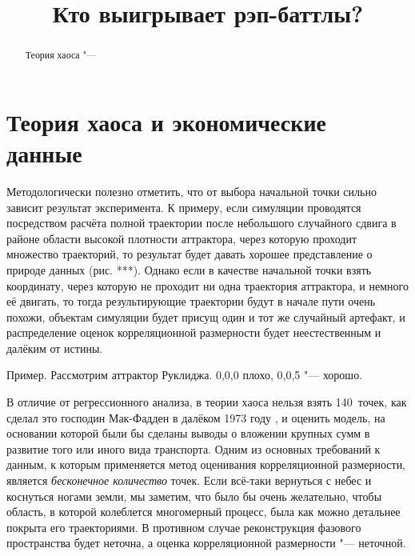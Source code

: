 \documentclass[final,pdftex]{../../template/epsilonj}
\begin{document}
	
	\begin{frontmatter}
		\title{Кто выигрывает рэп-баттлы?}
		
		\begin{aug}
			\author{ }%
			
			
			\address{НИУ ВШЭ, Москва.}
		\end{aug}
		
		\begin{abstract}
			Теория хаоса "--- 
		\end{abstract}
		
		\begin{keyword}
		\end{keyword}
		
	\end{frontmatter}
	
	
	\section{Теория хаоса и экономические данные}

Методологически полезно отметить, что от выбора начальной точки сильно зависит результат эксперимента. К примеру, если симуляции проводятся посредством расчёта полной траектории после небольшого случайного сдвига в районе области высокой плотности аттрактора, через которую проходит множество траекторий, то результат будет давать хорошее представление о природе данных (рис. ***). Однако если в качестве начальной точки взять координату, через которую не проходит ни одна траектория аттрактора, и немного её двигать, то тогда результирующие траектории будут в начале пути очень похожи, объектам симуляции будет присущ один и тот же случайный артефакт, и распределение оценок корреляционной размерности будет неестественным и далёким от истины.

Пример. Рассмотрим аттрактор Руклиджа. 0,0,0  плохо, 0,0,5 "--- хорошо.

В отличие от регрессионного анализа, в теории хаоса нельзя взять 140~точек, как сделал это господин Мак-Фадден в далёком 1973 году \citep{mcfadden73clogit}, и оценить модель, на основании которой были бы сделаны выводы о вложении крупных сумм в развитие того или иного вида транспорта. Одним из основных требований к данным, к которым применяется метод оценивания корреляционной размерности, является \textit{бесконечное количество} точек. Если всё-таки вернуться с небес и коснуться ногами земли, мы заметим, что было бы очень желательно, чтобы область, в которой колеблется многомерный процесс, была как можно детальнее покрыта его траекториями. В противном случае реконструкция фазового пространства будет неточна, а оценка корреляционной размерности "--- неточной.
\end{document}

